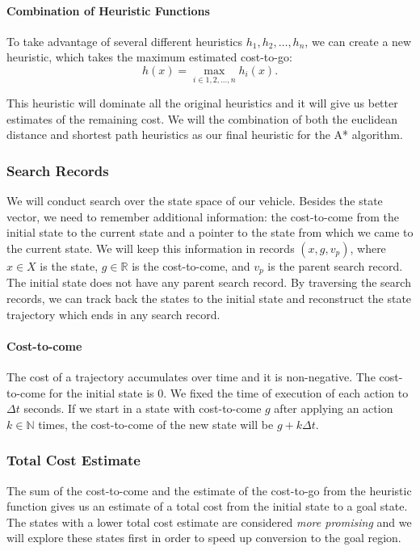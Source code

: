 \paragraph{Combination of Heuristic Functions}
To take advantage of several different heuristics $h_1,h_2,\ldots ,h_n$, we can create a new heuristic, which takes the maximum estimated cost-to-go:
\[
h(x)=\max_{i \in {1, 2, \ldots, n}}h_i(x).
\]

This heuristic will dominate all the original heuristics and it will give us better estimates of the remaining cost. We will the combination of both the euclidean distance and shortest path heuristics as our final heuristic for the A* algorithm.

\subsubsection{Search Records}

We will conduct search over the state space of our vehicle. Besides the state vector, we need to remember additional information: the cost-to-come from the initial state to the current state and a pointer to the state from which we came to the current state. We will keep this information in records $\left(x, g, v_p\right)$, where $x\in X$ is the state, $g\in \mathbb{R}$ is the cost-to-come, and $v_p$ is the parent search record. The initial state does not have any parent search record. By traversing the search records, we can track back the states to the initial state and reconstruct the state trajectory which ends in any search record.

\paragraph{Cost-to-come} The cost of a trajectory accumulates over time and it is non-negative. The cost-to-come for the initial state is $0$. We fixed the time of execution of each action to $\Delta t$ seconds. If we start in a state with cost-to-come $g$ after applying an action $k\in \mathbb{N}$ times, the cost-to-come of the new state will be $g+k\Delta t$.

\subsubsection{Total Cost Estimate} The sum of the cost-to-come and the estimate of the cost-to-go from the heuristic function gives us an estimate of a total cost from the initial state to a goal state. The states with a lower total cost estimate are considered \textit{more promising} and we will explore these states first in order to speed up conversion to the goal region.

